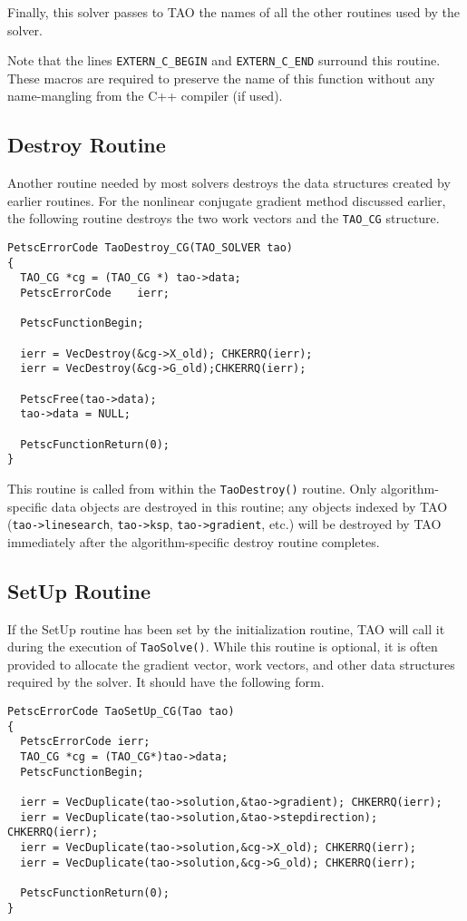 Finally, this solver passes to TAO the names of all the other routines
used by the solver.  

Note that the lines {\tt EXTERN\_C\_BEGIN} and {\tt EXTERN\_C\_END} surround
this routine.  These macros are required to preserve the name of this
function without any name-mangling from the C++ compiler (if used).

\subsection{Destroy Routine}
Another routine needed by most solvers destroys the data structures
created by earlier routines.  For the nonlinear conjugate gradient
method discussed earlier, the following routine destroys the two
work vectors and the {\tt TAO\_CG} structure.
\begin{verbatim}
PetscErrorCode TaoDestroy_CG(TAO_SOLVER tao)
{
  TAO_CG *cg = (TAO_CG *) tao->data;
  PetscErrorCode    ierr;

  PetscFunctionBegin;

  ierr = VecDestroy(&cg->X_old); CHKERRQ(ierr);
  ierr = VecDestroy(&cg->G_old);CHKERRQ(ierr);

  PetscFree(tao->data);
  tao->data = NULL;

  PetscFunctionReturn(0);
}
\end{verbatim}
This routine is called from within the {\tt TaoDestroy()} routine.
Only algorithm-specific data objects are destroyed in this
routine; any objects indexed by TAO ({\tt tao->linesearch}, {\tt tao->ksp}, {\tt tao->gradient}, etc.)
will be destroyed by TAO immediately after the algorithm-specific destroy 
routine completes.


\subsection{SetUp Routine}
If the SetUp routine has been set by the initialization routine, TAO
will call it during the execution of \texttt{TaoSolve()}.
While this routine is optional, it is often provided to allocate
the gradient vector, work vectors, and other data structures 
required by the solver.
It should have the following form.
\begin{verbatim}
PetscErrorCode TaoSetUp_CG(Tao tao)
{
  PetscErrorCode ierr;
  TAO_CG *cg = (TAO_CG*)tao->data;
  PetscFunctionBegin;

  ierr = VecDuplicate(tao->solution,&tao->gradient); CHKERRQ(ierr);
  ierr = VecDuplicate(tao->solution,&tao->stepdirection); CHKERRQ(ierr);
  ierr = VecDuplicate(tao->solution,&cg->X_old); CHKERRQ(ierr);
  ierr = VecDuplicate(tao->solution,&cg->G_old); CHKERRQ(ierr);

  PetscFunctionReturn(0);
}
\end{verbatim}

